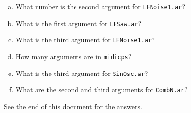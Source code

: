 \begin{enumerate}[a)]
\item What number is the second argument for \texttt{LFNoise1.ar}?
\item What is the first argument for \texttt{LFSaw.ar}?
\item What is the third argument for \texttt{LFNoise1.ar}?
\item How many arguments are in \texttt{midicps}?
\item What is the third argument for \texttt{SinOsc.ar}?
\item What are the second and third arguments for \texttt{CombN.ar}?
\end{enumerate}


 
See the end of this document for the answers.

\medskip
 
\bigskip
{}
\bigskip
